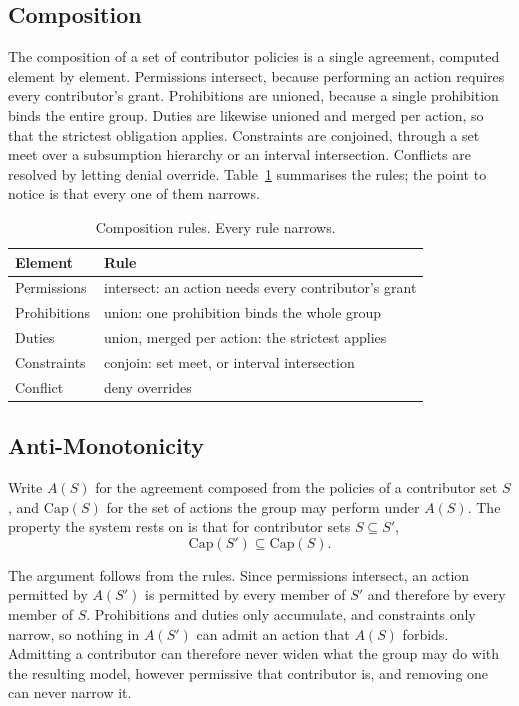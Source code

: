 \documentclass[10pt,conference]{IEEEtran}
\begin{document}
\subsection{Composition}

The composition of a set of contributor policies is a single agreement, computed
element by element. Permissions intersect, because performing an action requires
every contributor's grant. Prohibitions are unioned, because a single
prohibition binds the entire group. Duties are likewise unioned and merged per
action, so that the strictest obligation applies. Constraints are conjoined,
through a set meet over a subsumption hierarchy or an interval intersection.
Conflicts are resolved by letting denial override. Table~\ref{tab:rules}
summarises the rules; the point to notice is that every one of them narrows.

\begin{table}[t]
\caption{Composition rules. Every rule narrows.}
\label{tab:rules}
\centering
\begin{tabular}{ll}
\toprule
Element & Rule \\
\midrule
Permissions & intersect: an action needs every contributor's grant \\
Prohibitions & union: one prohibition binds the whole group \\
Duties & union, merged per action: the strictest applies \\
Constraints & conjoin: set meet, or interval intersection \\
Conflict & deny overrides \\
\bottomrule
\end{tabular}
\end{table}

\subsection{Anti-Monotonicity}

Write $A(S)$ for the agreement composed from the policies of a contributor set
$S$, and $\mathrm{Cap}(S)$ for the set of actions the group may perform under
$A(S)$. The property the system rests on is that for contributor sets
$S \subseteq S'$,
\[
\mathrm{Cap}(S') \subseteq \mathrm{Cap}(S).
\]

The argument follows from the rules. Since permissions intersect, an action
permitted by $A(S')$ is permitted by every member of $S'$ and therefore by every
member of $S$. Prohibitions and duties only accumulate, and constraints only
narrow, so nothing in $A(S')$ can admit an action that $A(S)$ forbids.
Admitting a contributor can therefore never widen what the group may do with the
resulting model, however permissive that contributor is, and removing one can
never narrow it.
\end{document}
